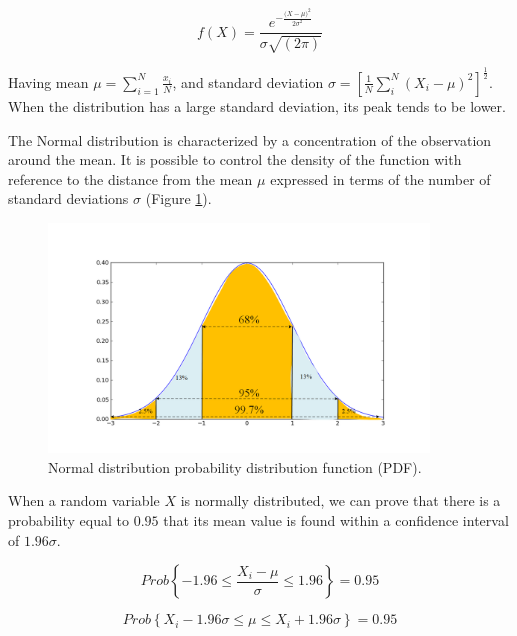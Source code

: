 \begin{equation}
f\left(X\right)=\frac{e^{-\frac{(X-{\mu)}^2}{2\sigma^2}}}{\sigma\sqrt{\left(2\pi\right)}}
\label{eq_pdfGaussian}
\end{equation}

Having mean $\mu=\sum_{i=1}^{N}\frac{x_i}{N}$, and standard deviation $\sigma=\left[\frac{1}{N}\sum_{i}^{N}\left(X_i-\mu\right)^2\right]^\frac{1}{2}$. When the distribution has a large standard deviation, its peak tends to be lower.\par
The Normal distribution is characterized by a concentration of the observation around the mean. It is possible to control the density of the function with reference to the distance from the mean $\mu$ expressed in terms of the number of standard deviations $\sigma$ (Figure \ref{fig_normal}).

\begin{figure}[hbt!]
\centering
\includegraphics[width=0.9\textwidth]{SectionLetsMath/elemStat_figures/fig_normal.png}
\captionsetup{type=figure}
\caption{Normal distribution probability distribution function (PDF).}
\label{fig_normal}
\end{figure}

When a random variable $X$ is normally distributed, we can prove that there is a  probability equal to $0.95$ that its mean value is found within a confidence interval of $1.96\sigma$.

\begin{equation}
Prob\left\{-1.96\le\frac{X_i-\mu}{\sigma}\le1.96\right\}=0.95
\label{eq_pdfConfidenceInterval1}
\end{equation}

\begin{equation}
Prob\left\{X_i-1.96\sigma\le\mu\le X_i+1.96\sigma\right\}=0.95
\label{eq_pdfConfidenceInterval2}
\end{equation}

